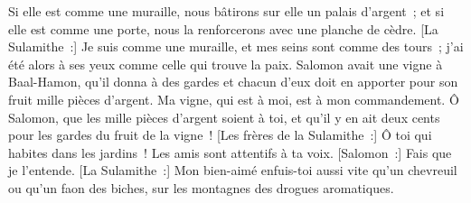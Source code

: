 \begin{multicols}{2}
Si elle est comme une muraille, nous bâtirons sur elle un palais d'argent~; et si elle est comme une porte, nous la renforcerons avec une planche de cèdre.
[La Sulamithe~:] Je suis comme une muraille, et mes seins sont comme des tours~; j'ai été alors à ses yeux comme celle qui trouve la paix. 
Salomon avait une vigne à Baal-Hamon, qu'il donna à des gardes et chacun d'eux doit en apporter pour son fruit mille pièces d'argent. 
Ma vigne, qui est à moi, est à mon commandement. Ô Salomon, que les mille pièces d'argent soient à toi, et qu'il y en ait deux cents pour les gardes du fruit de la vigne~!
[Les frères de la Sulamithe~:] Ô toi qui habites dans les jardins~! Les amis sont attentifs à ta voix. [Salomon~:] Fais que je l'entende. 
[La Sulamithe~:] Mon bien-aimé enfuis-toi aussi vite qu'un chevreuil ou qu'un faon des biches, sur les montagnes des drogues aromatiques. 
\PPE{}
\end{multicols}
